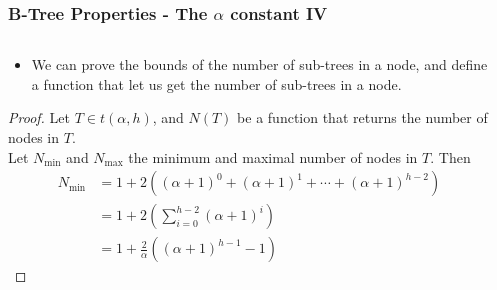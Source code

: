 \documentclass{beamer}
\begin{document}
\begin{frame}
    \frametitle{B-Tree Properties - The \(\alpha\) constant IV}
    \begin{columns}
        \begin{column}{\textlecolumn}
            \begin{block}{}
                \vspace{-0.5cm}
                \begin{itemize}
                    \item We can prove the bounds of the number of sub-trees in a node, and define a function that let us get the number of sub-trees in a node.
                \end{itemize}
                \begin{proof}\renewcommand{\qedsymbol}{}
                    Let \(T \in t\left(\alpha, h\right)\), and \(N(T)\) be a function that returns the number of nodes in \(T\).
                    \\
                    Let \(N_{\text{min}}\) and \(N_{\text{max}}\) the minimum and maximal number of nodes in \(T\). Then
                    \[
                        \begin{aligned}
                            N_{\text{min}} &= 1 + 2\left(\left(\alpha + 1\right)^0 + \left(\alpha + 1\right)^1 + \cdots + \left(\alpha + 1\right)^{h-2} \right) \\
                            & = 1 + 2\left(\sum^{h - 2}_{i = 0} \left(\alpha + 1\right)^i \right) \\
                            & = 1 + \frac{2}{\alpha}\left(\left(\alpha + 1\right)^{h - 1} - 1\right)
                        \end{aligned}
                    \]
                \end{proof}
            \end{block}
        \end{column}
        \begin{column}{\textricolumn}
        \end{column}
    \end{columns}
\end{frame}
\end{document}
